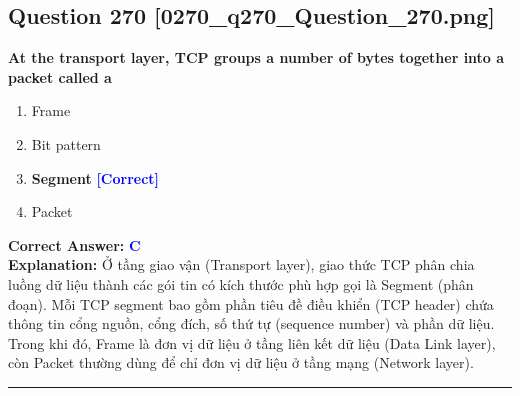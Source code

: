 \documentclass[11pt,a4paper]{article}
\begin{document}
\begin{minipage}{\textwidth}
\subsection*{Question 270 \quad \footnotesize{[0270\_q270\_Question\_270.png]}}
\noindent \textbf{At the transport layer, TCP groups a number of bytes together into a packet called a}

\begin{enumerate}[label=\Alph*.]
    \item Frame
    \item Bit pattern
    \item \textbf{Segment} \hfill \textcolor{blue}{\textbf{[Correct]}}
    \item Packet
\end{enumerate}

\noindent \textbf{Correct Answer:} \textcolor{blue}{\textbf{C}} \\[2pt]
\noindent \textbf{Explanation:} Ở tầng giao vận (Transport layer), giao thức TCP phân chia luồng dữ liệu thành các gói tin có kích thước phù hợp gọi là Segment (phân đoạn). Mỗi TCP segment bao gồm phần tiêu đề điều khiển (TCP header) chứa thông tin cổng nguồn, cổng đích, số thứ tự (sequence number) và phần dữ liệu. Trong khi đó, Frame là đơn vị dữ liệu ở tầng liên kết dữ liệu (Data Link layer), còn Packet thường dùng để chỉ đơn vị dữ liệu ở tầng mạng (Network layer).

\par\vspace{0.3cm}
\hrule
\vspace{0.3cm}
\end{minipage}
\end{document}
